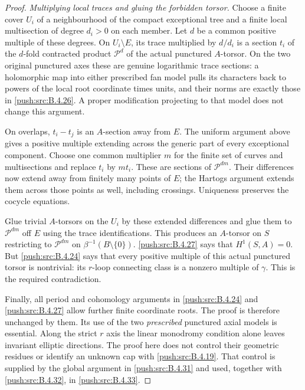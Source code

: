 \begin{proof}
\emph{Multiplying local traces and gluing the forbidden torsor.}
Choose a finite cover $U_i$ of a
neighbourhood of the compact exceptional
tree and a finite local multisection of
degree $d_i>0$ on each member. Let $d$ be
a common positive multiple of these degrees.
On $U_i\setminus E$, its trace multiplied
by $d/d_i$ is a section $t_i$ of the
$d$-fold contracted product $\mathcal P^d$
of the actual punctured $A$-torsor.
On the two original punctured axes these
are genuine logarithmic trace sections:
a holomorphic map into either prescribed
fan model pulls its characters back to
powers of the local root coordinate times
units, and their norms are exactly those
in \ref{push:src:B.4.26}. A proper modification projecting
to that model does not change this argument.

On overlaps, $t_i-t_j$ is an $A$-section
away from $E$. The uniform argument above
gives a positive multiple extending across
the generic part of every exceptional
component. Choose one common multiplier
$m$ for the finite set of curves and
multisections and replace $t_i$ by $mt_i$.
These are sections of $\mathcal P^{dm}$.
Their differences now extend away from
finitely many points of $E$; the Hartogs
argument extends them across those points
as well, including crossings. Uniqueness
preserves the cocycle equations.

Glue trivial $A$-torsors on the $U_i$ by
these extended differences and glue them
to $\mathcal P^{dm}$ off $E$ using the
trace identifications. This produces an
$A$-torsor on $S$ restricting to
$\mathcal P^{dm}$ on
$\beta^{-1}(B\setminus\{0\})$.
\ref{push:src:B.4.27} says that $H^1(S,A)=0$.
But \ref{push:src:B.4.24} says that every positive
multiple of this actual punctured torsor
is nontrivial: its $r$-loop connecting
class is a nonzero multiple of $\gamma$.
This is the required contradiction.

Finally, all period and cohomology arguments
in \ref{push:src:B.4.24} and \ref{push:src:B.4.27} allow further finite
coordinate roots. The proof is therefore
unchanged by them. Its use of the two
\emph{prescribed} punctured axial models
is essential. Along the strict $r$ axis the linear monodromy
condition alone leaves invariant elliptic directions.
The proof here does not control their geometric
residues or identify an unknown cap with \ref{push:src:B.4.19}.
That control is supplied by the global argument in
\ref{push:src:B.4.31} and used, together with \ref{push:src:B.4.32}, in \ref{push:src:B.4.33}.
\end{proof}

